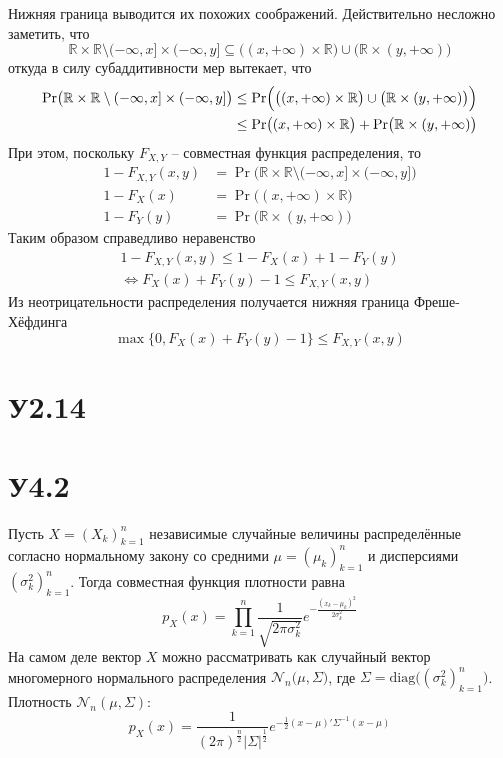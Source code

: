 \documentclass[a4paper]{article}
\newcommand{\Real}{\mathbb{R}}
\newcommand{\Ncal}{\mathcal{N}}
\begin{document}
Нижняя граница выводится их похожих соображений. Действительно несложно заметить,
что
\[
\Real\times \Real \setminus (-\infty,x]\times (-\infty,y]
\subseteq \bigl((x,+\infty)\times\Real\bigr) \cup \bigl(\Real\times(y,+\infty)\bigr)
\]
откуда в силу субаддитивности мер вытекает, что
\begin{align*}
	\Pr\bigl( \Real\times \Real \setminus (-\infty,x]\times (-\infty,y] \bigr)
	&\leq \Pr\Bigl( \bigl((x,+\infty)\times\Real\bigr) \cup \bigl(\Real\times(y,+\infty)\bigr) \Bigr)\\
	&\leq \Pr\bigl( (x,+\infty)\times \Real \bigr) + \Pr\bigl( \Real\times (y,+\infty) \bigr)
\end{align*}
При этом, поскольку $F_{X,Y}$ -- совместная функция распределения, то
\begin{align*}
	1-F_{X,Y}(x,y) &= \Pr\bigl( \Real\times \Real \setminus (-\infty,x]\times (-\infty,y] \bigr)\\
	1-F_X(x) &= \Pr\bigl( (x,+\infty)\times \Real \bigr)\\
	1-F_Y(y) &= \Pr\bigl( \Real\times (y,+\infty) \bigr)
\end{align*}
Таким образом справедливо неравенство
\begin{multline*}
	1-F_{X,Y}(x,y) \leq 1-F_X(x) + 1-F_Y(y) \\ \Leftrightarrow F_X(x) + F_Y(y) - 1 \leq F_{X,Y}(x,y)
\end{multline*}
Из неотрицательности распределения получается нижняя граница Фреше-Хёфдинга
\[ \max\bigl\{0,F_X(x) + F_Y(y) - 1\bigr\} \leq F_{X,Y}(x,y) \]


\section{У2.14} %
\label{sec:problem_2_14}


\section{У4.2} %
\label{sec:problem_4_2}

Пусть $X=(X_k)_{k=1}^n$ независимые случайные величины распределённые согласно
нормальному закону со средними $\mu = (\mu_k)_{k=1}^n$ и дисперсиями $(\sigma^2_k)_{k=1}^n$.
Тогда совместная функция плотности равна
\[p_X(x) = \prod_{k=1}^n \frac{1}{\sqrt{2\pi \sigma_k^2}} e^{-\frac{(x_k-\mu_k)^2}{2\sigma^2_k}}\]
На самом деле вектор $X$ можно рассматривать как случайный вектор многомерного
нормального распределения $\Ncal_n\bigl(\mu,\Sigma\bigr)$, где
$\Sigma = \text{diag}\bigl((\sigma^2_k)_{k=1}^n\bigr)$.
Плотность $\Ncal_n(\mu,\Sigma)$:
\[
p_X(x)
= \frac{1}{(2\pi)^\frac{n}{2} \lvert \Sigma \rvert^\frac{1}{2}}
	e^{-\frac{1}{2}(x-\mu)'\Sigma^{-1}(x-\mu)}
\]
\end{document}
